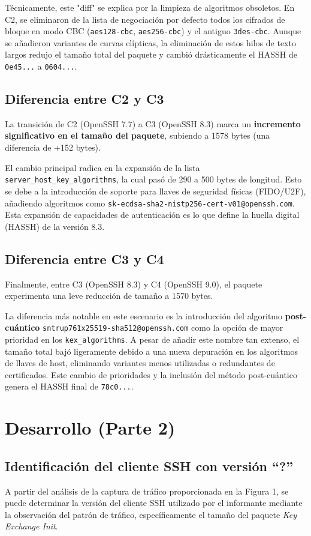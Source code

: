\documentclass[letter,12pt]{article}
\begin{document}
Técnicamente, este "diff" se explica por la limpieza de algoritmos obsoletos. En C2, se eliminaron de la lista de negociación por defecto todos los cifrados de bloque en modo CBC (\texttt{aes128-cbc}, \texttt{aes256-cbc}) y el antiguo \texttt{3des-cbc}. Aunque se añadieron variantes de curvas elípticas, la eliminación de estos hilos de texto largos redujo el tamaño total del paquete y cambió drásticamente el HASSH de \texttt{0e45...} a \texttt{0604...}.

\subsection{Diferencia entre C2 y C3}
La transición de C2 (OpenSSH 7.7) a C3 (OpenSSH 8.3) marca un \textbf{incremento significativo en el tamaño del paquete}, subiendo a 1578 bytes (una diferencia de +152 bytes).

El cambio principal radica en la expansión de la lista \texttt{server\_host\_key\_algorithms}, la cual pasó de 290 a 500 bytes de longitud. Esto se debe a la introducción de soporte para llaves de seguridad físicas (FIDO/U2F), añadiendo algoritmos como \texttt{sk-ecdsa-sha2-nistp256-cert-v01@openssh.com}. Esta expansión de capacidades de autenticación es lo que define la huella digital (HASSH) de la versión 8.3.

\subsection{Diferencia entre C3 y C4}
Finalmente, entre C3 (OpenSSH 8.3) y C4 (OpenSSH 9.0), el paquete experimenta una leve reducción de tamaño a 1570 bytes. 

La diferencia más notable en este escenario es la introducción del algoritmo \textbf{post-cuántico} \texttt{sntrup761x25519-sha512@openssh.com} como la opción de mayor prioridad en los \texttt{kex\_algorithms}. A pesar de añadir este nombre tan extenso, el tamaño total bajó ligeramente debido a una nueva depuración en los algoritmos de llaves de host, eliminando variantes menos utilizadas o redundantes de certificados. Este cambio de prioridades y la inclusión del método post-cuántico genera el HASSH final de \texttt{78c0...}.

\newpage

\section{Desarrollo (Parte 2)}

\subsection{Identificación del cliente SSH con versión \textquotedblleft?\textquotedblright}
A partir del análisis de la captura de tráfico proporcionada en la Figura 1, se puede determinar la versión del cliente SSH utilizado por el informante mediante la observación del patrón de tráfico, específicamente el tamaño del paquete \textit{Key Exchange Init}.
\end{document}
